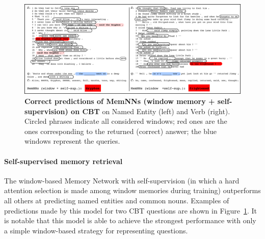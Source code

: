 %

\begin{figure}[ht]
\newcommand{\mc}[1]{\multicolumn{2}{l}{#1}}
  \begin{center}
   \includegraphics[width=\textwidth]{Chapter_6/cbt_fig2.png}
      \caption{\label{tab:ex_pred_cbt} {\bf Correct predictions of
          MemNNs (window memory + self-supervision) on CBT} on Named Entity (left) and
          Verb (right). Circled phrases indicate all considered
          windows; red ones are the ones corresponding to the returned
          (correct) answer; the blue windows represent the queries.}\label{tab:ex_pred_cbt}
    \end{center}
  \vspace*{-2ex}
\end{figure}


\paragraph{Self-supervised memory retrieval} 
%
The window-based Memory Network with self-supervision (in which a hard attention selection 
is made among window memories during training)
outperforms all others at predicting named entities and common nouns.
%
%
Examples of predictions made by this model for two CBT questions are shown
in Figure~\ref{tab:ex_pred_cbt}. It is notable that this model is able to achieve the strongest performance with only a simple window-based strategy for representing questions. 
%

